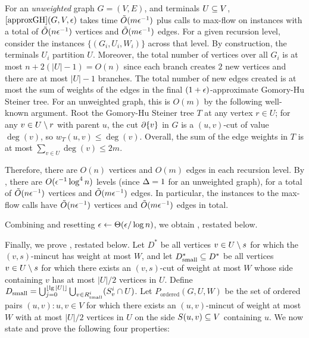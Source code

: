 \BL{}
For an \emph{unweighted} graph $G=(V,E)$, and terminals $U\subseteq V$, $\ref{approxGH}(G,V,\epsilon)$ takes time $\tilde{O}(m\epsilon^{-1})$ plus calls to max-flow on instances with a total of $\tilde{O}(n\epsilon^{-1})$ vertices and $\tilde{O}(m\epsilon^{-1})$ edges.%
\EL
\BP
For a given recursion level, consider the instances $\{ (G_i,U_i,W_i)\}$ across that level. By construction, the terminals $U_i$ partition $U$. Moreover, the total number of vertices over all $G_i$ is at most $n+2(|U|-1)=O(n)$ since each branch creates $2$ new vertices and there are at most $|U|-1$ branches. The total number of new edges created is at most the sum of weights of the edges in the final $(1+\epsilon)$-approximate Gomory-Hu Steiner tree. For an unweighted graph, this is $O(m)$ by the following well-known argument. Root the Gomory-Hu Steiner tree $T$ at any vertex $r\in U$; for any $v\in U\setminus r$ with parent $u$, the cut $\partial\{v\}$ in $G$ is a $(u,v)$-cut of value $\deg(v)$, so $w_T(u,v)\le\deg(v)$. Overall, the sum of the edge weights in $T$ is at most $\sum_{v\in U}\deg(v)\le2m$.

Therefore, there are $O(n)$ vertices and $O(m)$ edges in each recursion level. By , there are $O(\epsilon^{-1}\log^4n)$ levels (since $\Delta=1$ for an unweighted graph), for a total of $\tilde{O}(n\epsilon^{-1})$ vertices and $\tilde{O}(m\epsilon^{-1})$ edges. In particular, the instances to the max-flow calls have $\tilde{O}(n\epsilon^{-1})$ vertices and $\tilde{O}(m\epsilon^{-1})$ edges in total.
\EP

Combining  and resetting $\epsilon\gets\Theta(\epsilon/\log n)$, we obtain , restated below.
\ApproxU*

Finally, we prove , restated below.
\LemD*
\BP
Let $D^*$ be all vertices $v\in U\setminus s$ for which the $(v,s)$-mincut has weight at most $ W$, and let $D^*_{\textup{small}}\subseteq D^*$ be all vertices $v\in U\setminus s$ for which there exists an $(v,s)$-cut of weight at most $W$ whose side containing $v$ has at most $|U|/2$ vertices in $U$. Define $D_{\textup{small}} = \bigcup_{j=0}^{\lfloor\lg|U|\rfloor}\bigcup_{v\in R^i_{\textup{small}}} (S^i_v\cap U)$.
Let $P_{\text{ordered}}(G,U,W)$ be the set of ordered pairs $(u,v):u,v\in V$ for which there exists an $(u,v)$-mincut of weight at most $W$ with at most $|U|/2$ vertices in $U$ on the side $S(u,v)\subseteq V$ containing $u$. %
We now state and prove the following four properties:

